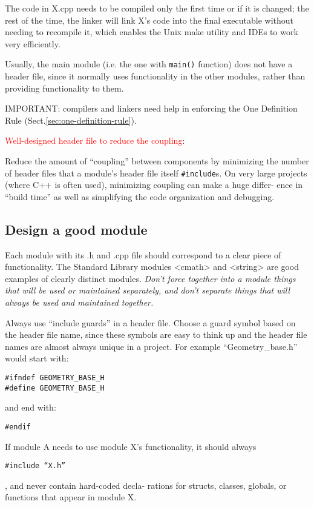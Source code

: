 The code in X.cpp needs to be compiled only the first time or if it is changed;
the rest of the time, the linker will link X’s code into the final executable
without needing to recompile it, which enables the Unix make utility and IDEs to
work very efficiently.

Usually, the main module (i.e. the one with \verb!main()! function) does not
have a header file, since it normally uses functionality in the other modules,
rather than providing functionality to them.

IMPORTANT: compilers and linkers need help in enforcing the One Definition Rule
(Sect.\ref{sec:one-definition-rule}).

\textcolor{red}{Well-designed header file to reduce the coupling}:

Reduce the amount of “coupling” between components by minimizing the number of
header files that a module’s header file itself \verb!#include!s. On very large
projects (where C++ is often used), minimizing coupling can make a huge differ-
ence in “build time” as well as simplifying the code organization and debugging.

\subsection{Design a good module}
\label{sec:module-in-C++-good-design}
\label{sec:compilation-unit}

Each module with its .h and .cpp file should correspond to a clear piece of
functionality.
The Standard Library modules <cmath> and <string> are good examples of clearly
distinct modules.
{\it Don’t force together into a module things that will be used or maintained
separately, and don’t separate things that will always be used and maintained
together.}


Always use “include guards” in a header file. Choose a guard symbol based on the
header file name, since these symbols are easy to think up and the header file
names are almost always unique in a project.
For example “Geometry_base.h” would start with:
\begin{verbatim}
#ifndef GEOMETRY_BASE_H
#define GEOMETRY_BASE_H
\end{verbatim}
and end with:
\begin{verbatim}
#endif
\end{verbatim}
 
 
If module A needs to use module X’s functionality, it should always 
\begin{verbatim}
#include “X.h”
\end{verbatim}	
, and never contain hard-coded decla- rations for structs, classes,
globals, or functions that appear in module X.

